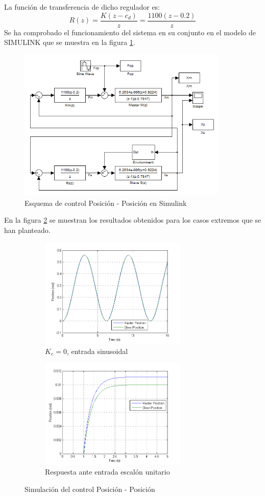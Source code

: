 La función de transferencia de dicho regulador es:
\begin{equation}
R(z) = \dfrac{K(z-c_d)}{z} = \dfrac{1100(z-0.2)}{z}
\label{eq:regulador}
\end{equation}
Se ha comprobado el funcionamiento del sistema en su conjunto en el modelo de SIMULINK que se muestra en la figura \ref{fig:pos-pos-esq}.
\begin{figure}[htbp]
\centering
	\includegraphics[width=10cm]{pos-pos-esq}
	\caption{Esquema de control Posición - Posición en Simulink}
  	\label{fig:pos-pos-esq}
\end{figure}
En la figura \ref{fig:pos-pos-sim} se muestran los resultados obtenidos para los casos extremos que se han planteado.
\begin{figure}[htbp]
\centering
	\begin{subfigure}[h]
		\centering
		\includegraphics[height=5.25cm]{pos-pos-libre}
		\caption{$K_e = 0$, entrada sinusoidal}
	\end{subfigure}
	\begin{subfigure}[h]
		\centering
		\includegraphics[height=5.25cm]{pos-pos-env}
		\caption{Respuesta ante entrada escalón unitario}
    \end{subfigure}
	\caption{Simulación del control Posición - Posición}
  	\label{fig:pos-pos-sim}
\end{figure}

